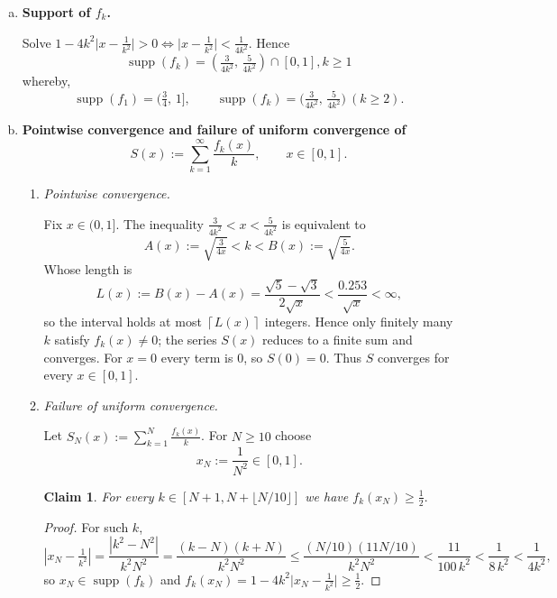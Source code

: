 \documentclass[dvipsnames,12pt]{exam}
\newtheorem{claim}{Claim}
\theoremstyle{definition}
\begin{document}
\begin{enumerate}[a)]
\item \textbf{Support of $f_k$.}

Solve
\( 1-4k^{2}\lvert x-\tfrac1{k^{2}}\rvert>0 \iff \lvert x-\tfrac1{k^{2}}\rvert<\tfrac1{4k^{2}} \).
Hence
\[ \boxed{ \operatorname{supp}(f_k) =\left(\tfrac{3}{4k^{2}},\,\tfrac{5}{4k^{2}}\right) \cap[0,1], k\ge1} \]
whereby,
\[
  \operatorname{supp}(f_1)=(\tfrac34,\,1],\qquad
  \operatorname{supp}(f_k)=\bigl(\tfrac{3}{4k^{2}},\,\tfrac{5}{4k^{2}}\bigr)
  \ (k\ge2).
\]

\item \textbf{Pointwise convergence and failure of uniform convergence of}
      \[ S(x):=\sum_{k=1}^{\infty}\frac{f_k(x)}{k}, \qquad x\in[0,1]. \]

\begin{enumerate}[label=(\roman*)]
\item \emph{Pointwise convergence.}

Fix $x\in(0,1]$.  
The inequality
\( \frac{3}{4k^{2}}<x<\frac{5}{4k^{2}} \)
is equivalent to
\[ A(x):=\sqrt{\tfrac{3}{4x}} <k< B(x):=\sqrt{\tfrac{5}{4x}}. \]
Whose length is \[ L(x):=B(x)-A(x) =\frac{\sqrt5-\sqrt3}{2\sqrt{x}} <\frac{0.253}{\sqrt{x}}<\infty, \]
so the interval holds at most
\( \left\lceil L(x)\right\rceil \)
integers.  Hence only finitely many \(k\) satisfy \(f_k(x)\neq0\); the
series \(S(x)\) reduces to a finite sum and converges.
For \(x=0\) every term is \(0\), so \(S(0)=0\).  
Thus \(S\) converges for every \(x\in[0,1]\).

\item \emph{Failure of uniform convergence.}

Let \(S_N(x):=\sum_{k=1}^{N}\frac{f_k(x)}{k}\).
For \(N\ge10\) choose 
\[ x_N:=\frac1{N^{2}}\in[0,1]. \]

\medskip
\begin{claim}
For every
\( k\in\left[N+1,N+\lfloor N/10\rfloor\right] \)
we have
\( f_k(x_N)\ge\frac12. \)
\end{claim}


\begin{proof}
For such \(k\),
\[ \left|x_N-\tfrac1{k^{2}}\right| =\frac{|k^{2}-N^{2}|}{k^{2}N^{2}} =\frac{(k-N)(k+N)}{k^{2}N^{2}} \le\frac{(N/10)(11N/10)}{k^{2}N^{2}} <\frac{11}{100\,k^{2}} <\frac1{8\,k^{2}} <\frac1{4k^{2}},
\]
so \(x_N\in\operatorname{supp}(f_k)\) and \(f_k(x_N)=1-4k^{2}\lvert x_N-\tfrac1{k^{2}}\rvert\ge\frac12\). 
\end{proof}


\end{enumerate}
\end{enumerate}
\end{document}
